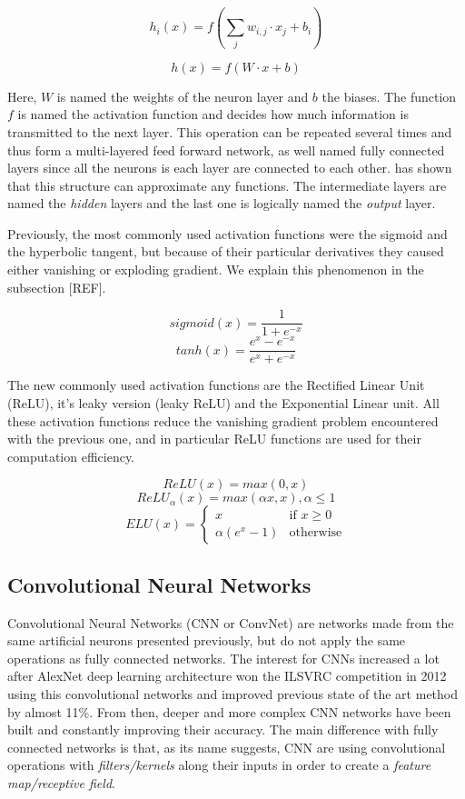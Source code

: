 \documentclass[master,final,11pt]{iscs-thesis}
\begin{document}
\[
	h_{i}(x) = f(\sum_{j}{w_{i,j}\cdot x_j} + b_i)
\]

\[
	h(x) = f(W \cdot x + b)
\]

Here, $W$ is named the weights of the neuron layer and $b$ the biases. The function $f$ is named the activation function and decides how much information is transmitted to the next layer. This operation can be repeated several times and thus form a multi-layered feed forward network, as well named fully connected layers since all the neurons is each layer are connected to each other. \cite{FFN} has shown that this structure can approximate any functions. The intermediate layers are named the \textit{hidden} layers and the last one is logically named the \textit{output} layer.

Previously, the most commonly used activation functions were the sigmoid and the hyperbolic tangent, but because of their particular derivatives they caused either vanishing or exploding gradient. We explain this phenomenon in the subsection [REF]. 

\[sigmoid(x)  = \frac{1}{1+e^{-x}}\]
\[tanh(x)  = \frac{e^x - e^{-x}}{e^x + e^{-x}}\]

The new commonly used activation functions are the Rectified Linear Unit (ReLU), it's leaky version (leaky ReLU) and the Exponential Linear unit. All these activation functions reduce the vanishing gradient problem encountered with the previous one, and in particular ReLU functions are used for their computation efficiency.

\[ReLU(x)  = max(0,x)\]
\[ReLU_{\alpha}(x)  = max(\alpha x, x), \alpha 	\leq 1 \]
\[ELU(x)  = \left\{
    \begin{array}{ll}
        x & \mbox{if } x \geq 0 \\
        \alpha (e^x-1) & \mbox{otherwise}
    \end{array}
\right. \]

\subsection{Convolutional Neural Networks}

Convolutional Neural Networks (CNN or ConvNet) \cite{unpool,CNNrecent} are networks made from the same artificial neurons presented previously, but do not apply the same operations as fully connected networks.
The interest for CNNs increased a lot after AlexNet deep learning architecture won the ILSVRC competition in 2012 using this convolutional networks and improved previous state of the art method by almost 11\%. From then, deeper and more complex CNN networks have been built and constantly improving their accuracy.
The main difference with fully connected networks is that, as its name suggests, CNN are using convolutional operations with \textit{filters/kernels} along their inputs in order to create a \textit{feature map/receptive field}.
\end{document}

